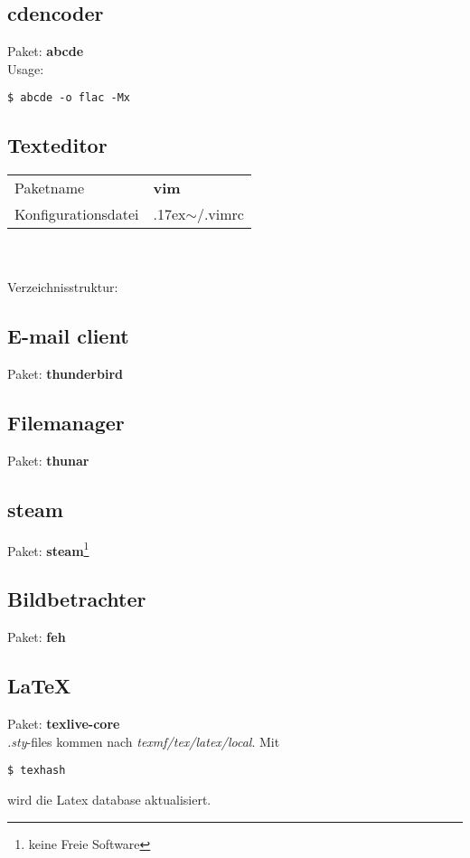 \subsection{cdencoder}
Paket: \textbf{abcde}  \\ 
Usage:
\begin{lstlisting}[style=Bash]
$ abcde -o flac -Mx
\end{lstlisting}

\subsection{Texteditor}
\begin{tabular}{l|l}
Paketname & \textbf{vim} \\ 
Konfigurationsdatei & {{\raise.17ex\hbox{$\scriptstyle\mathtt{\sim}$}}/.vimrc} \\
\end{tabular}
\\ \\
Verzeichnisstruktur:  

\subsection{E-mail client}
Paket: \textbf{thunderbird}

\subsection{Filemanager}
Paket: \textbf{thunar} 

\subsection{steam}
Paket: \textbf{steam}\footnote{keine Freie Software} 

\subsection{Bildbetrachter}
Paket: \textbf{feh}

\subsection{\LaTeX}
Paket: \textbf{texlive-core} \\
\emph{.sty}-files kommen nach \emph{texmf/tex/latex/local}.
Mit 
\begin{lstlisting}[style=Bash, frame=none]
$ texhash
\end{lstlisting}
wird die Latex database aktualisiert.
